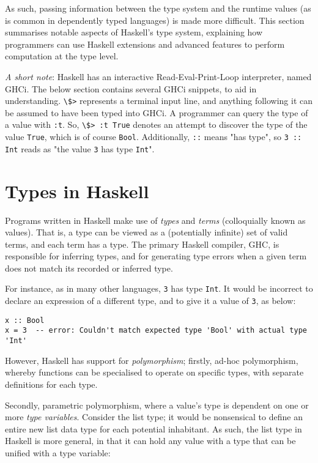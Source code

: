 \documentclass[12pt, a4paper, bibliography=totocnumbered]{scrreprt}
\newcommand{\inline}[1]{\lstinline[basicstyle=\ttfamily\footnotesize]{#1}}
\begin{document}
As such, passing information between the type system and the runtime values (as is common in dependently typed languages) is made more difficult. This section summarises notable aspects of Haskell's type system, explaining how programmers can use Haskell extensions and advanced features to perform computation at the type level.

\emph{A short note}: Haskell has an interactive Read-Eval-Print-Loop interpreter, named GHCi. The below section contains several GHCi snippets, to aid in understanding. \inline{\$>} represents a terminal input line, and anything following it can be assumed to have been typed into GHCi. A programmer can query the type of a value with \inline{:t}. So, \inline{\$> :t True} denotes an attempt to discover the type of the value \inline{True}, which is of course \inline{Bool}. Additionally, \inline{::} means "has type", so \inline{3 :: Int} reads as "the value \inline{3} has type \inline{Int}".

\section{Types in Haskell}

Programs written in Haskell make use of \emph{types} and \emph{terms} (colloquially known as values). That is, a type can be viewed as a (potentially infinite) set of valid terms, and each term has a type. The primary Haskell compiler, GHC, is responsible for inferring types, and for generating type errors when a given term does not match its recorded or inferred type.

For instance, as in many other languages, \inline{3} has type \inline{Int}. It would be incorrect to declare an expression of a different type, and to give it a value of \inline{3}, as below:

\begin{lstlisting}
x :: Bool
x = 3  -- error: Couldn't match expected type 'Bool' with actual type 'Int'
\end{lstlisting}

However, Haskell has support for \emph{polymorphism}; firstly, ad-hoc polymorphism, whereby functions can be specialised to operate on specific types, with separate definitions for each type.

Secondly, parametric polymorphism, where a value's type is dependent on one or more \emph{type variables}. Consider the list type; it would be nonsensical to define an entire new list data type for each potential inhabitant. As such, the list type in Haskell is more general, in that it can hold any value with a type that can be unified with a type variable:
\end{document}
